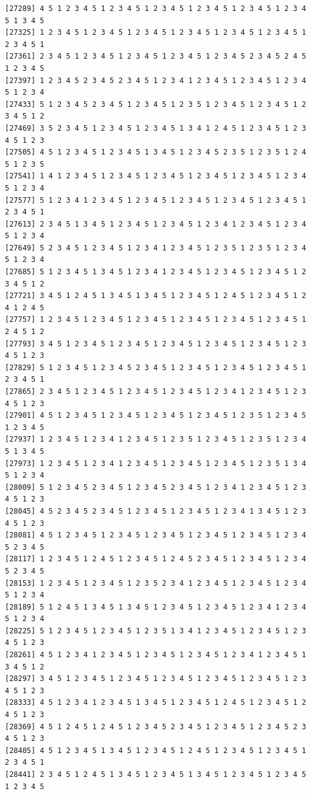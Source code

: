 \documentclass[
  english,
]{book}
\begin{document}
\begin{verbatim}
[27289] 4 5 1 2 3 4 5 1 2 3 4 5 1 2 3 4 5 1 2 3 4 5 1 2 3 4 5 1 2 3 4 5 1 3 4 5
[27325] 1 2 3 4 5 1 2 3 4 5 1 2 3 4 5 1 2 3 4 5 1 2 3 4 5 1 2 3 4 5 1 2 3 4 5 1
[27361] 2 3 4 5 1 2 3 4 5 1 2 3 4 5 1 2 3 4 5 1 2 3 4 5 2 3 4 5 2 4 5 1 2 3 4 5
[27397] 1 2 3 4 5 2 3 4 5 2 3 4 5 1 2 3 4 1 2 3 4 5 1 2 3 4 5 1 2 3 4 5 1 2 3 4
[27433] 5 1 2 3 4 5 2 3 4 5 1 2 3 4 5 1 2 3 5 1 2 3 4 5 1 2 3 4 5 1 2 3 4 5 1 2
[27469] 3 5 2 3 4 5 1 2 3 4 5 1 2 3 4 5 1 3 4 1 2 4 5 1 2 3 4 5 1 2 3 4 5 1 2 3
[27505] 4 5 1 2 3 4 5 1 2 3 4 5 1 3 4 5 1 2 3 4 5 2 3 5 1 2 3 5 1 2 4 5 1 2 3 5
[27541] 1 4 1 2 3 4 5 1 2 3 4 5 1 2 3 4 5 1 2 3 4 5 1 2 3 4 5 1 2 3 4 5 1 2 3 4
[27577] 5 1 2 3 4 1 2 3 4 5 1 2 3 4 5 1 2 3 4 5 1 2 3 4 5 1 2 3 4 5 1 2 3 4 5 1
[27613] 2 3 4 5 1 3 4 5 1 2 3 4 5 1 2 3 4 5 1 2 3 4 1 2 3 4 5 1 2 3 4 5 1 2 3 4
[27649] 5 2 3 4 5 1 2 3 4 5 1 2 3 4 1 2 3 4 5 1 2 3 5 1 2 3 5 1 2 3 4 5 1 2 3 4
[27685] 5 1 2 3 4 5 1 3 4 5 1 2 3 4 1 2 3 4 5 1 2 3 4 5 1 2 3 4 5 1 2 3 4 5 1 2
[27721] 3 4 5 1 2 4 5 1 3 4 5 1 3 4 5 1 2 3 4 5 1 2 4 5 1 2 3 4 5 1 2 4 1 2 4 5
[27757] 1 2 3 4 5 1 2 3 4 5 1 2 3 4 5 1 2 3 4 5 1 2 3 4 5 1 2 3 4 5 1 2 4 5 1 2
[27793] 3 4 5 1 2 3 4 5 1 2 3 4 5 1 2 3 4 5 1 2 3 4 5 1 2 3 4 5 1 2 3 4 5 1 2 3
[27829] 5 1 2 3 4 5 1 2 3 4 5 2 3 4 5 1 2 3 4 5 1 2 3 4 5 1 2 3 4 5 1 2 3 4 5 1
[27865] 2 3 4 5 1 2 3 4 5 1 2 3 4 5 1 2 3 4 5 1 2 3 4 1 2 3 4 5 1 2 3 4 5 1 2 3
[27901] 4 5 1 2 3 4 5 1 2 3 4 5 1 2 3 4 5 1 2 3 4 5 1 2 3 5 1 2 3 4 5 1 2 3 4 5
[27937] 1 2 3 4 5 1 2 3 4 1 2 3 4 5 1 2 3 5 1 2 3 4 5 1 2 3 5 1 2 3 4 5 1 3 4 5
[27973] 1 2 3 4 5 1 2 3 4 1 2 3 4 5 1 2 3 4 5 1 2 3 4 5 1 2 3 5 1 3 4 5 1 2 3 4
[28009] 5 1 2 3 4 5 2 3 4 5 1 2 3 4 5 2 3 4 5 1 2 3 4 1 2 3 4 5 1 2 3 4 5 1 2 3
[28045] 4 5 2 3 4 5 2 3 4 5 1 2 3 4 5 1 2 3 4 5 1 2 3 4 1 3 4 5 1 2 3 4 5 1 2 3
[28081] 4 5 1 2 3 4 5 1 2 3 4 5 1 2 3 4 5 1 2 3 4 5 1 2 3 4 5 1 2 3 4 5 2 3 4 5
[28117] 1 2 3 4 5 1 2 4 5 1 2 3 4 5 1 2 4 5 2 3 4 5 1 2 3 4 5 1 2 3 4 5 2 3 4 5
[28153] 1 2 3 4 5 1 2 3 4 5 1 2 3 5 2 3 4 1 2 3 4 5 1 2 3 4 5 1 2 3 4 5 1 2 3 4
[28189] 5 1 2 4 5 1 3 4 5 1 3 4 5 1 2 3 4 5 1 2 3 4 5 1 2 3 4 1 2 3 4 5 1 2 3 4
[28225] 5 1 2 3 4 5 1 2 3 4 5 1 2 3 5 1 3 4 1 2 3 4 5 1 2 3 4 5 1 2 3 4 5 1 2 3
[28261] 4 5 1 2 3 4 1 2 3 4 5 1 2 3 4 5 1 2 3 4 5 1 2 3 4 1 2 3 4 5 1 3 4 5 1 2
[28297] 3 4 5 1 2 3 4 5 1 2 3 4 5 1 2 3 4 5 1 2 3 4 5 1 2 3 4 5 1 2 3 4 5 1 2 3
[28333] 4 5 1 2 3 4 1 2 3 4 5 1 3 4 5 1 2 3 4 5 1 2 4 5 1 2 3 4 5 1 2 4 5 1 2 3
[28369] 4 5 1 2 4 5 1 2 4 5 1 2 3 4 5 2 3 4 5 1 2 3 4 5 1 2 3 4 5 2 3 4 5 1 2 3
[28405] 4 5 1 2 3 4 5 1 3 4 5 1 2 3 4 5 1 2 4 5 1 2 3 4 5 1 2 3 4 5 1 2 3 4 5 1
[28441] 2 3 4 5 1 2 4 5 1 3 4 5 1 2 3 4 5 1 3 4 5 1 2 3 4 5 1 2 3 4 5 1 2 3 4 5

\end{verbatim}
\end{document}
